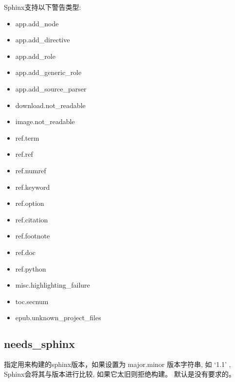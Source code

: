 \documentclass[a4paper,10pt,english]{sphinxmanual}
\begin{document}
\sphinxAtStartPar
Sphinx支持以下警告类型:
\begin{itemize}
\item {} 
\sphinxAtStartPar
app.add\_node

\item {} 
\sphinxAtStartPar
app.add\_directive

\item {} 
\sphinxAtStartPar
app.add\_role

\item {} 
\sphinxAtStartPar
app.add\_generic\_role

\item {} 
\sphinxAtStartPar
app.add\_source\_parser

\item {} 
\sphinxAtStartPar
download.not\_readable

\item {} 
\sphinxAtStartPar
image.not\_readable

\item {} 
\sphinxAtStartPar
ref.term

\item {} 
\sphinxAtStartPar
ref.ref

\item {} 
\sphinxAtStartPar
ref.numref

\item {} 
\sphinxAtStartPar
ref.keyword

\item {} 
\sphinxAtStartPar
ref.option

\item {} 
\sphinxAtStartPar
ref.citation

\item {} 
\sphinxAtStartPar
ref.footnote

\item {} 
\sphinxAtStartPar
ref.doc

\item {} 
\sphinxAtStartPar
ref.python

\item {} 
\sphinxAtStartPar
misc.highlighting\_failure

\item {} 
\sphinxAtStartPar
toc.secnum

\item {} 
\sphinxAtStartPar
epub.unknown\_project\_files

\end{itemize}


\subsection{needs\_sphinx}
\label{\detokenize{sphinx_conf:needs-sphinx}}
\sphinxAtStartPar
指定用来构建的sphinx版本，如果设置为 major.minor 版本字符串, 如 ‘1.1’ ,
Sphinx会将其与版本进行比较, 如果它太旧则拒绝构建。 默认是没有要求的。
\end{document}
